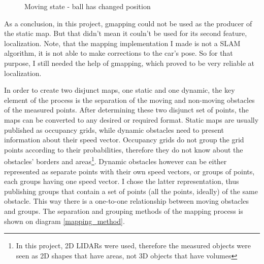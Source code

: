 \begin{figure}[!ht]
\centering
{}
\caption{Moving state - ball has changed position}
\label{gmapping_drawback_after_move}
\end{figure}

As a conclusion, in this project, gmapping could not be used as the producer of the static map. But that didn't mean it couln't be used for its second feature, localization. Note, that the mapping implementation I made is not a SLAM algorithm, it is not able to make corrections to the car's pose. So for that purpose, I still needed the help of gmapping, which proved to be very reliable at localization.

In order to create two disjunct maps, one static and one dynamic, the key element of the process is the separation of the moving and non-moving obstacles of the measured points. After determining these two disjunct set of points, the maps can be converted to any desired or required format. Static maps are usually published as occupancy grids, while dynamic obstacles need to present information about their speed vector. Occupancy grids do not group the grid points according to their probabilities, therefore they do not know about the obstacles' borders and areas\footnote{In this project, 2D LIDARs were used, therefore the measured objects were seen as 2D shapes that have areas, not 3D objects that have volumes}. Dynamic obstacles however can be either represented as separate points with their own speed vectors, or groups of points, each groups having one speed vector. I chose the latter representation, thus publishing groups that contain a set of points (all the points, ideally) of the same obstacle. This way there is a one-to-one relationship between moving obstacles and groups. The separation and grouping methods of the mapping process is shown on diagram \ref{mapping_method}.

